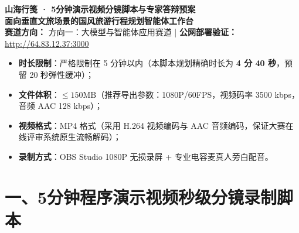 \documentclass[11pt,a4paper,UTF8]{ctexart}
\begin{document}
\begin{center}
    {\LARGE \bfseries \color{inkred} 山海行笺 · 5分钟演示视频分镜脚本与专家答辩预案}\\[0.4em]
    {\large \textbf{面向垂直文旅场景的国风旅游行程规划智能体工作台}}\\[0.6em]
    \small \textbf{赛道方向：} 方向一：大模型与智能体应用赛道 \quad | \quad \textbf{公网部署验证：} \url{http://64.83.12.37:3000}
\end{center}

\vspace{0.5em}

\begin{tcolorbox}[colback=paper,colframe=black!25,title=\textbf{【大赛视频技术参数规范说明】}]
\small
\begin{itemize}
    \item \textbf{时长限制}：严格限制在 5 分钟以内（本脚本规划精确时长为 \textbf{4 分 40 秒}，预留 20 秒弹性缓冲）；
    \item \textbf{文件体积}：$\le 150\text{MB}$（推荐导出参数：1080P/60FPS，视频码率 3500 kbps，音频 AAC 128 kbps）；
    \item \textbf{视频格式}：MP4 格式（采用 H.264 视频编码与 AAC 音频编码，保证大赛在线评审系统原生流畅解码）；
    \item \textbf{录制方式}：OBS Studio 1080P 无损录屏 + 专业电容麦真人旁白配音。
\end{itemize}
\end{tcolorbox}

\section*{一、5分钟程序演示视频秒级分镜录制脚本}
\end{document}
